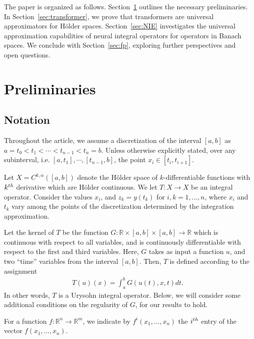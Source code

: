\documentclass[a4paper,12pt,reqno]{amsart}
\theoremstyle{definition}
\theoremstyle{remark}
\begin{document}
The paper is organized as follows. Section~\ref{sec:pre} outlines the necessary preliminaries. In Section~\ref{sec:transformer}, we prove that transformers are universal approximators for Hölder spaces. Section~\ref{sec:NIE} investigates the universal approximation capabilities of neural integral operators for operators in Banach spaces. We conclude with Section~\ref{sec:fp}, exploring further perspectives and open questions.







\section{Preliminaries}\label{sec:pre}
\subsection{Notation}
Throughout the article, we assume a discretization of the interval $[a, b]$ as $a = t_0 < t_1 < \cdots < t_{n-1} < t_n = b$. Unless otherwise explicitly stated, over any subinterval, i.e. $[a, t_1], \cdots, [t_{n-1},b]$, the point $x_i\in [t_i, t_{i+1}]$.



Let $X= C^{k,\alpha}([a,b])$ denote the H\"older space of $k$-differentiable functions with $k^{\rm th}$ derivative which are H\"older continuous. We let $T: X\longrightarrow X$ be an integral operator. Consider the values $x_i$, and $z_k = y(t_k)$ for $i, k=1,\ldots , n$, where $x_i$ and $t_k$ vary among the points of the discretization determined by the integration approximation.


Let the kernel of $T$ be the function $G: \mathbb R\times [a,b]\times [a,b] \longrightarrow \mathbb R$ which is continuous with respect to all variables, and is continuously differentiable with respect to the first and third variables. Here, $G$ takes as input a function $u$, and two ``time'' variables from the interval $[a,b]$. Then, $T$ is defined according to the assignment
\begin{eqnarray*}
    T(u)(x) = \int_a^bG(u(t),x,t)dt.
\end{eqnarray*}
In other words, $T$ is a Urysohn integral operator. Below, we will consider some additional conditions on the regularity of $G$, for our results to hold.  

For a function $f: \mathbb R^n \longrightarrow \mathbb R^m$, we indicate by $f^i(x_1, \ldots, x_n)$ the $i^{\rm th}$ entry of the vector $f(x_1, \ldots, x_n)$. 
\end{document}
